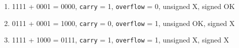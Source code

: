\begin{enumerate}
	\item 1111 + 0001 = 0000, \texttt{carry} = 1, \texttt{overflow} = 0, unsigned X, signed OK
	\item 0111 + 0001  = 1000, \texttt{carry} = 0, \texttt{overflow} = 1, unsigned OK, signed X
	\item 1111 + 1000  = 0111, \texttt{carry} = 1, \texttt{overflow} = 1, unsigned X, signed X
\end{enumerate}

